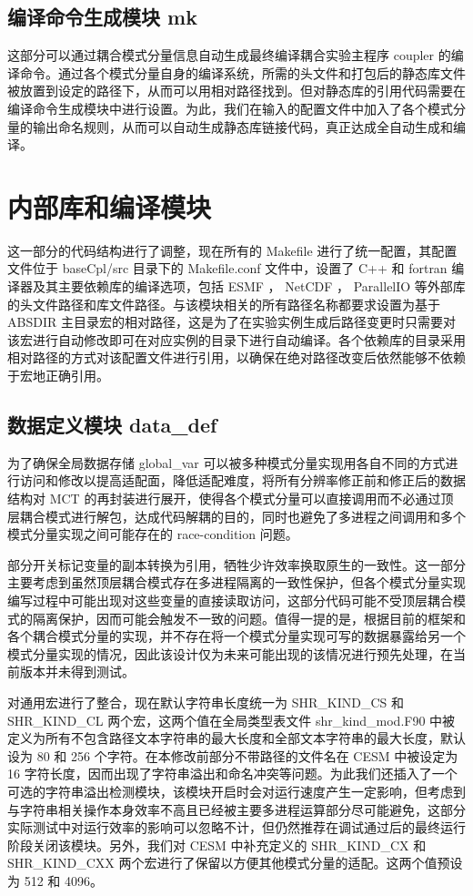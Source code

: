 \subsection{编译命令生成模块 mk}

这部分可以通过耦合模式分量信息自动生成最终编译耦合实验主程序 coupler 的编译命令。通过各个模式分量自身的编译系统，所需的头文件和打包后的静态库文件被放置到设定的路径下，从而可以用相对路径找到。但对静态库的引用代码需要在编译命令生成模块中进行设置。为此，我们在输入的配置文件中加入了各个模式分量的输出命名规则，从而可以自动生成静态库链接代码，真正达成全自动生成和编译。

\section{内部库和编译模块}

这一部分的代码结构进行了调整，现在所有的 Makefile 进行了统一配置，其配置文件位于 baseCpl/src 目录下的 Makefile.conf 文件中，设置了 C++ 和 fortran 编译器及其主要依赖库的编译选项，包括 ESMF ， NetCDF ， ParallelIO 等外部库的头文件路径和库文件路径。与该模块相关的所有路径名称都要求设置为基于 ABSDIR 主目录宏的相对路径，这是为了在实验实例生成后路径变更时只需要对该宏进行自动修改即可在对应实例的目录下进行自动编译。各个依赖库的目录采用相对路径的方式对该配置文件进行引用，以确保在绝对路径改变后依然能够不依赖于宏地正确引用。

\subsection{数据定义模块 data\_def}

为了确保全局数据存储 global\_var 可以被多种模式分量实现用各自不同的方式进行访问和修改以提高适配面，降低适配难度，将所有分辨率修正前和修正后的数据结构对 MCT 的再封装进行展开，使得各个模式分量可以直接调用而不必通过顶层耦合模式进行解包，达成代码解耦的目的，同时也避免了多进程之间调用和多个模式分量实现之间可能存在的 race-condition 问题。

部分开关标记变量的副本转换为引用，牺牲少许效率换取原生的一致性。这一部分主要考虑到虽然顶层耦合模式存在多进程隔离的一致性保护，但各个模式分量实现编写过程中可能出现对这些变量的直接读取访问，这部分代码可能不受顶层耦合模式的隔离保护，因而可能会触发不一致的问题。值得一提的是，根据目前的框架和各个耦合模式分量的实现，并不存在将一个模式分量实现可写的数据暴露给另一个模式分量实现的情况，因此该设计仅为未来可能出现的该情况进行预先处理，在当前版本并未得到测试。

对通用宏进行了整合，现在默认字符串长度统一为 SHR\_KIND\_CS 和 SHR\_KIND\_CL 两个宏，这两个值在全局类型表文件 shr\_kind\_mod.F90 中被定义为所有不包含路径文本字符串的最大长度和全部文本字符串的最大长度，默认设为 80 和 256 个字符。在本修改前部分不带路径的文件名在 CESM 中被设定为 16 字符长度，因而出现了字符串溢出和命名冲突等问题。为此我们还插入了一个可选的字符串溢出检测模块，该模块开启时会对运行速度产生一定影响，但考虑到与字符串相关操作本身效率不高且已经被主要多进程运算部分尽可能避免，这部分实际测试中对运行效率的影响可以忽略不计，但仍然推荐在调试通过后的最终运行阶段关闭该模块。另外，我们对 CESM 中补充定义的 SHR\_KIND\_CX 和 SHR\_KIND\_CXX 两个宏进行了保留以方便其他模式分量的适配。这两个值预设为 512 和 4096。

